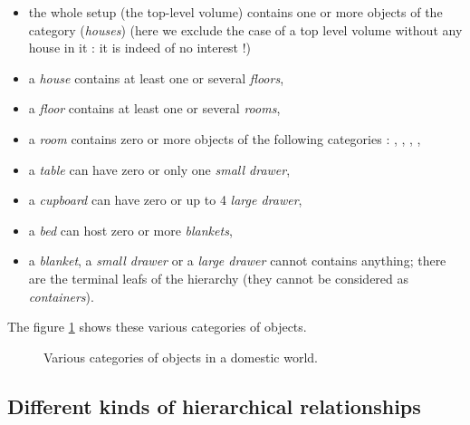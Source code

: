 \begin{itemize}
  
\item the  whole setup (the  top-level volume) contains one  or more
  objects  of  the    category  (\emph{houses})  (here  we
  exclude the case  of a top level volume without any  house in it :
  it is indeed of no interest !)
  
\item a \emph{house} contains at least one or several \emph{floors},
  
\item a \emph{floor} contains at least one or several \emph{rooms},
  
\item a \emph{room} contains zero or more objects of the following 
  categories : , , , ,
  
\item a \emph{table} can have zero or only one \emph{small drawer},
  
\item a \emph{cupboard} can have zero or up to 4 \emph{large drawer},
  
\item a \emph{bed} can host zero or more \emph{blankets},
  
\item  a  \emph{blanket}, a  \emph{small  drawer}  or a  \emph{large
  drawer} cannot contains anything;  there are the terminal leafs of
  the hierarchy (they cannot be considered as \emph{containers}).
  
\end{itemize}

\pn The figure \ref{fig:house:1} shows these various categories of objects.

\begin{figure}[h]
\begin{center}
\scalebox{1.}{}
\end{center}
\caption{Various categories of objects in a domestic world.}\label{fig:house:1}
\end{figure}

\subsection{Different kinds of hierarchical relationships}

